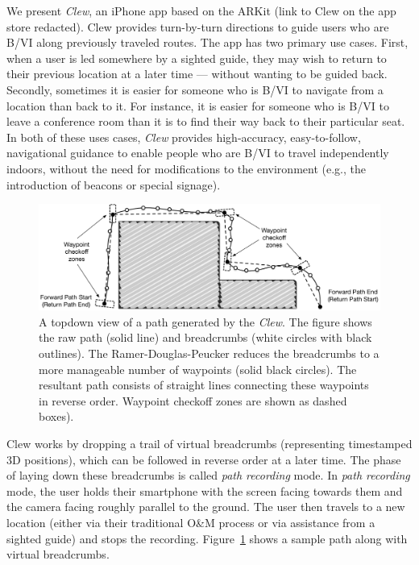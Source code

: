 \documentclass[chi_draft]{sigchi}
\newcommand{\BVI}{B/VI\xspace}
\newcommand{\OM}{O\&M\xspace}
\begin{document}
We present \emph{Clew}, an iPhone app based on the ARKit (link to Clew on the app store redacted).  Clew provides turn-by-turn directions to guide users who are \BVI along previously traveled routes.  The app has two primary use cases.  First, when a user is led somewhere by a sighted guide, they may wish to return to their previous location at a later time --- without wanting to be guided back.  Secondly, sometimes it is easier for someone who is \BVI to navigate from a location than back to it.  For instance, it is easier for someone who is \BVI to leave a conference room than it is to find their way back to their particular seat.  In both of these uses cases, \emph{Clew} provides high-accuracy, easy-to-follow, navigational guidance to enable people who are \BVI to travel independently indoors, without the need for modifications to the environment (e.g., the introduction of beacons or special signage).  

\begin{figure}
\begin{center}
\includegraphics[width=\linewidth]{Figures/samplepath}
\end{center}
\caption{A topdown view of a path generated by the \emph{Clew}.  The figure shows the raw path (solid line) and breadcrumbs (white circles with black outlines).  The Ramer-Douglas-Peucker reduces the breadcrumbs to a more manageable number of waypoints (solid black circles).  The resultant path consists of straight lines connecting these waypoints in reverse order.  Waypoint checkoff zones are shown as dashed boxes).\label{fig:samplepath}}
\end{figure}
Clew works by dropping a trail of virtual breadcrumbs (representing timestamped 3D positions), which can be followed in reverse order at a later time.  The phase of laying down these breadcrumbs is called \emph{path recording} mode.  In \emph{path recording} mode, the user holds their smartphone with the screen facing towards them and the camera facing roughly parallel to the ground.  The user then travels to a new location (either via their traditional \OM process or via assistance from a sighted guide) and stops the recording.  Figure~\ref{fig:samplepath} shows a sample path along with virtual breadcrumbs.%
\end{document}
